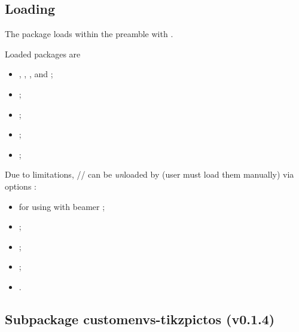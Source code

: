\documentclass[english,11pt,a4paper]{article}
\begin{document}
\subsection{Loading}

The package loads within the preamble with .

Loaded packages are 

\begin{itemize}
	\item {}, , ,  and  ;
	\item {} ;
	\item {} ;
	\item {} ;
	\item {} ;
\end{itemize}

Due to limitations, // can be \textit{un}loaded by  (user must load them manually) via options :

\begin{itemize}
	\item {} for using with \textsf{beamer} ;
	\item {} ;
	\item {} ;
	\item {} ;
	\item {}.
\end{itemize}

\begin{codehigh}[language=latex/latex3,style/main=teal!25,style/code=teal!25]
\usepackage{customenvs}

\usepackage[option(s)]{customenvs}
\end{codehigh}

\pagebreak

\subsection{Subpackage customenvs-tikzpictos (v0.1.4)}
\end{document}
